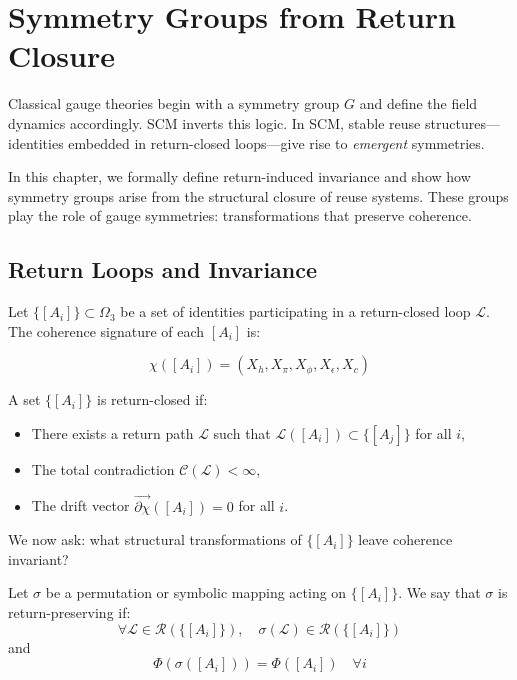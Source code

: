 \chapter{Symmetry Groups from Return Closure} \label{chapter-symmetry-return-closure}

Classical gauge theories begin with a symmetry group \( G \) and define the field dynamics accordingly. SCM inverts this logic. In SCM, stable reuse structures—identities embedded in return-closed loops—give rise to \emph{emergent} symmetries.

In this chapter, we formally define return-induced invariance and show how symmetry groups arise from the structural closure of reuse systems. These groups play the role of gauge symmetries: transformations that preserve coherence.

\section{Return Loops and Invariance}

Let \( \{[A_i]\} \subset \Omega_3 \) be a set of identities participating in a return-closed loop \( \mathcal{L} \). The coherence signature of each \( [A_i] \) is:

\[
\chi([A_i]) = (X_h, X_\pi, X_\phi, X_\epsilon, X_c)
\]

\begin{definition}
A set \( \{[A_i]\} \) is return-closed if:
\begin{itemize}
  \item There exists a return path \( \mathcal{L} \) such that \( \mathcal{L}([A_i]) \subset \{[A_j]\} \) for all \( i \),
  \item The total contradiction \( \mathcal{C}(\mathcal{L}) < \infty \),
  \item The drift vector \( \vec{\partial \chi}([A_i]) = 0 \) for all \( i \).
\end{itemize}
\end{definition}

We now ask: what structural transformations of \( \{[A_i]\} \) leave coherence invariant?

\begin{definition}
Let \( \sigma \) be a permutation or symbolic mapping acting on \( \{[A_i]\} \). We say that \( \sigma \) is return-preserving if:
\[
\forall \mathcal{L} \in \mathcal{R}(\{[A_i]\}), \quad \sigma(\mathcal{L}) \in \mathcal{R}(\{[A_i]\})
\]
and
\[
\Phi(\sigma([A_i])) = \Phi([A_i]) \quad \forall i
\]
\end{definition}

